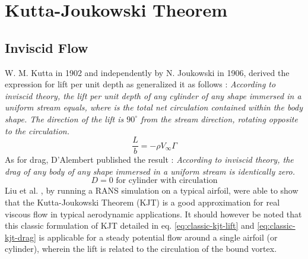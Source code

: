 \chapter{Kutta-Joukowski Theorem} %
\label{Chapter3}

\section{Inviscid Flow}
W. M. Kutta in 1902 and independently by N. Joukowski in 1906, derived the expression for lift per unit depth as generalized it as follows \parencite{White2018-ai}:
\emph{According to inviscid theory, the lift per unit depth of any cylinder of any shape immersed in a uniform stream equals, where is the total net circulation contained within the body shape. The direction of the lift is $90^{\circ}$ from the stream direction, rotating opposite to the circulation.}
\begin{equation}
	\frac{L}{b} = - \rho V_{\infty} \Gamma
	\label{eq:classic-kjt-lift}
\end{equation}
As for drag, D'Alembert published the result \parencite{White2018-ai}:
\emph{According to inviscid theory, the drag of any body of any shape immersed in a uniform stream is identically zero.}
\begin{equation}
	D = 0 \text{ for cylinder with circulation}
	\label{eq:classic-kjt-drag}
\end{equation}
Liu et al. \parencite{Liu2015}, by running a RANS simulation on a typical airfoil, were able to show that the Kutta-Joukowski Theorem (KJT) is a good approximation for real viscous flow in typical aerodynamic applications. It should however be noted that this classic formulation of KJT detailed in eq. \ref{eq:classic-kjt-lift} and \ref{eq:classic-kjt-drag} is applicable for a steady potential flow around a single airfoil (or cylinder), wherein the lift is related to the circulation of the bound vortex.

